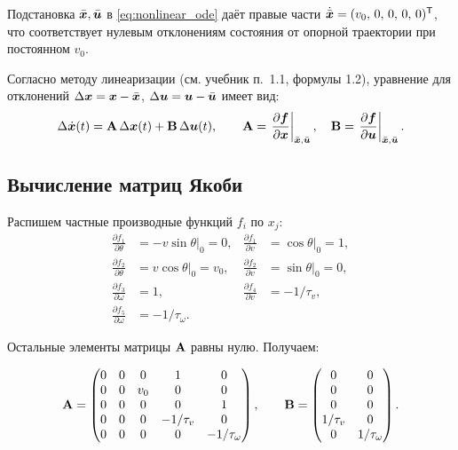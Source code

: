 Подстановка $\bar{\bm{x}}, \bar{\bm{u}}$ в \eqref{eq:nonlinear_ode}
даёт правые части $\dot{\bar{\bm{x}}} = (v_0,\,0,\,0,\,0,\,0)^{\mathsf{T}}$, что
соответствует нулевым отклонениям состояния от опорной траектории при
постоянном $v_0$.

Согласно методу линеаризации (см. учебник п.~1.1, формулы 1.2),
уравнение для отклонений $\Delta\bm{x} = \bm{x} - \bar{\bm{x}}$,
$\Delta\bm{u} = \bm{u} - \bar{\bm{u}}$ имеет вид:
\begin{equation}
  \Delta\dot{\bm{x}}(t) = \mathbf{A}\,\Delta\bm{x}(t) + \mathbf{B}\,\Delta\bm{u}(t),
  \qquad
  \mathbf{A} = \left.\frac{\partial \bm{f}}{\partial\bm{x}}\right|_{\bar{\bm{x}},\bar{\bm{u}}},
  \quad
  \mathbf{B} = \left.\frac{\partial \bm{f}}{\partial\bm{u}}\right|_{\bar{\bm{x}},\bar{\bm{u}}}.
  \label{eq:linearization}
\end{equation}

\subsection{Вычисление матриц Якоби}

Распишем частные производные функций $f_i$ по $x_j$:
\begin{align*}
  \frac{\partial f_1}{\partial \theta} &= -v\sin\theta\big|_0 = 0, &
  \frac{\partial f_1}{\partial v} &= \cos\theta\big|_0 = 1,\\
  \frac{\partial f_2}{\partial \theta} &= v\cos\theta\big|_0 = v_0, &
  \frac{\partial f_2}{\partial v} &= \sin\theta\big|_0 = 0,\\
  \frac{\partial f_3}{\partial \omega} &= 1, &
  \frac{\partial f_4}{\partial v} &= -1/\tau_v,\\
  \frac{\partial f_5}{\partial \omega} &= -1/\tau_\omega.
\end{align*}

Остальные элементы матрицы $\mathbf{A}$ равны нулю. Получаем:

\begin{formulabox}[title={Линеаризованная модель в пространстве состояний}]
\begin{equation}
  \mathbf{A} = \begin{pmatrix}
    0 & 0 & 0    & 1 & 0 \\
    0 & 0 & v_0  & 0 & 0 \\
    0 & 0 & 0    & 0 & 1 \\
    0 & 0 & 0    & -1/\tau_v & 0 \\
    0 & 0 & 0    & 0 & -1/\tau_\omega
  \end{pmatrix},
  \qquad
  \mathbf{B} = \begin{pmatrix}
    0 & 0 \\
    0 & 0 \\
    0 & 0 \\
    1/\tau_v & 0 \\
    0 & 1/\tau_\omega
  \end{pmatrix}.
  \label{eq:AB_matrices}
\end{equation}
\end{formulabox}

